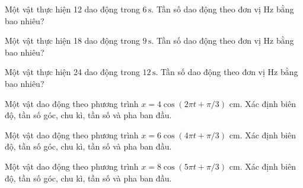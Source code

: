 \begin{ex}
Một vật thực hiện 12 dao động trong $6\,\text{s}$. Tần số dao động theo đơn vị Hz bằng bao nhiêu?
\end{ex}

\begin{ex}
Một vật thực hiện 18 dao động trong $9\,\text{s}$. Tần số dao động theo đơn vị Hz bằng bao nhiêu?
\end{ex}

\begin{ex}
Một vật thực hiện 24 dao động trong $12\,\text{s}$. Tần số dao động theo đơn vị Hz bằng bao nhiêu?
\end{ex}

\begin{ex}
Một vật dao động theo phương trình $x=4\cos(2\pi t+\pi/3)$ cm. Xác định biên độ, tần số góc, chu kì, tần số và pha ban đầu.
\choiceTF

\end{ex}

\begin{ex}
Một vật dao động theo phương trình $x=6\cos(4\pi t+\pi/3)$ cm. Xác định biên độ, tần số góc, chu kì, tần số và pha ban đầu.
\choiceTF

\end{ex}

\begin{ex}
Một vật dao động theo phương trình $x=8\cos(5\pi t+\pi/3)$ cm. Xác định biên độ, tần số góc, chu kì, tần số và pha ban đầu.
\choiceTF

\end{ex}

